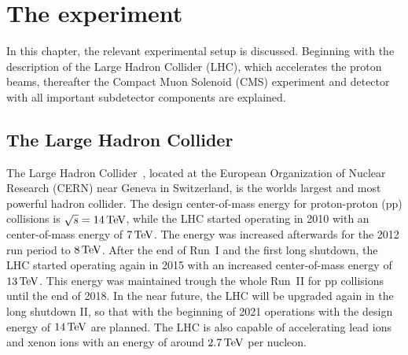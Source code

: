 \chapter{The experiment}\label{chap:experiment}
\minitoc
In this chapter, the relevant experimental setup is discussed. Beginning with the description of the Large Hadron Collider (LHC), which accelerates the proton beams, thereafter the Compact Muon Solenoid (CMS) experiment and detector with all important subdetector components are explained.
\section{The Large Hadron Collider}\label{sec:LHC}
The Large Hadron Collider~\cite{LHC1,LHC2}, located at the European Organization of Nuclear Research (CERN) near Geneva in Switzerland, is the worlds largest and most powerful hadron collider. The design center-of-mass energy for proton-proton (pp) collisions is $\sqrt{s}=14\,\text{Te\hspace{-.08em}V}$, while the LHC started operating in 2010 with an center-of-mass energy of $7\,\text{Te\hspace{-.08em}V}$. The energy was increased afterwards for the 2012 run period to $8\,\text{Te\hspace{-.08em}V}$. After the end of Run~I and the first long shutdown, the LHC started operating again in 2015 with an increased center-of-mass energy of $13\,\text{Te\hspace{-.08em}V}$. This energy was maintained trough the whole Run~II for pp collisions until the end of 2018. In the near future, the LHC will be upgraded again in the long shutdown II, so that with the beginning of 2021 operations with the design energy of $14\,\text{Te\hspace{-.08em}V}$ are planned.
The LHC is also capable of accelerating lead ions and xenon ions with an energy of around $2.7\,\text{Te\hspace{-.08em}V}$ per nucleon.\\
